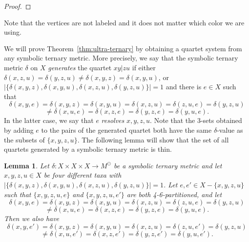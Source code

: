 \documentclass{article}
\newtheorem{lemma}{Lemma}
\begin{document}
\begin{proof}
% 


\end{proof}

Note that the vertices are not labeled and it does not matter which color we 
are using. 

We will prove Theorem~\ref{thm:ultra-ternary} by obtaining a quartet system 
from any symbolic ternary metric. More precisely, we say that the symbolic 
ternary metric $\delta$ on $X$ {\em generates} the quartet $xy|zu$ if either 
$\delta(x,z,u)=\delta(y,z,u) \neq \delta(x,y,z)=\delta(x,y,u)$, or 
$|\{\delta(x,y,z),\delta(x,y,u),\delta(x,z,u),\delta(y,z,u)\}|=1$ and there is $e \in X$ 
such that 
$$\delta(x,y,e)=\delta(x,y,z)=\delta(x,y,u)=\delta(x,z,u)=\delta(z,u,e)=\delta(y
,z,u)$$ 
 $$\neq \delta(x,u,e)=\delta(x,z,e)=\delta(y,z,e)=\delta(y,u,e).$$
In the latter case, we say that $e$ {\em resolves} $x,y,z,u$. Note that the 3-sets 
obtained by adding $e$ to the pairs of the generated quartet both have the same 
$\delta$-value as the subsets of $\{x,y,z,u\}$. 
The following lemma 
will show that the set of all quartets generated by a symbolic ternary metric is 
thin. 

\begin{lemma} \label{lem:quartet2}
Let $\delta: X\times X\times X \to M^{\odot}$ be a symbolic ternary metric 
and let $x,y,z,u\in X$ be four different taxa with 
$|\{\delta(x,y,z),\delta(x,y,u),\delta(x,z,u),\delta(y,z,u)\}|= 1$. Let 
$e,e' \in X-\{x,y,z,u\}$ such that $\{x,y,z,u,e\}$ and $\{x,y,z,u,e'\}$ are 
both 4-6-partitioned, and let 
$$\delta(x,y,e)=\delta(x,y,z)=\delta(x,y,u)=\delta(x,z,u)=\delta(z,u,e)=\delta(y
,z,u)$$ 
 $$\neq \delta(x,u,e)=\delta(x,z,e)=\delta(y,z,e)=\delta(y,u,e).$$
Then we also have 
$$\delta(x,y,e')=\delta(x,y,z)=\delta(x,y,u)=\delta(x,z,u)=\delta(z,u,e')=\delta(y
,z,u)$$ 
 $$\neq \delta(x,u,e')=\delta(x,z,e')=\delta(y,z,e')=\delta(y,u,e').$$
\end{lemma}
\end{document}
